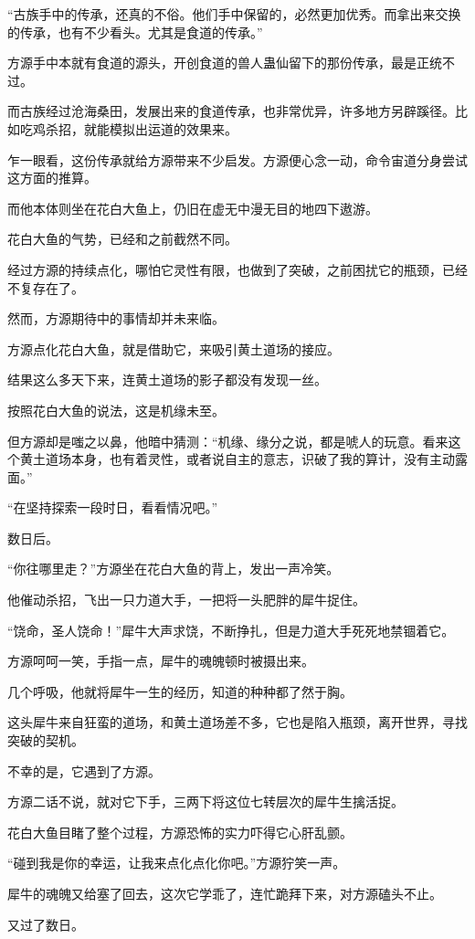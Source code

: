 \begin{this_body}
“古族手中的传承，还真的不俗。他们手中保留的，必然更加优秀。而拿出来交换的传承，也有不少看头。尤其是食道的传承。”

方源手中本就有食道的源头，开创食道的兽人蛊仙留下的那份传承，最是正统不过。

而古族经过沧海桑田，发展出来的食道传承，也非常优异，许多地方另辟蹊径。比如吃鸡杀招，就能模拟出运道的效果来。

乍一眼看，这份传承就给方源带来不少启发。方源便心念一动，命令宙道分身尝试这方面的推算。

而他本体则坐在花白大鱼上，仍旧在虚无中漫无目的地四下遨游。

花白大鱼的气势，已经和之前截然不同。

经过方源的持续点化，哪怕它灵性有限，也做到了突破，之前困扰它的瓶颈，已经不复存在了。

然而，方源期待中的事情却并未来临。

方源点化花白大鱼，就是借助它，来吸引黄土道场的接应。

结果这么多天下来，连黄土道场的影子都没有发现一丝。

按照花白大鱼的说法，这是机缘未至。

但方源却是嗤之以鼻，他暗中猜测：“机缘、缘分之说，都是唬人的玩意。看来这个黄土道场本身，也有着灵性，或者说自主的意志，识破了我的算计，没有主动露面。”

“在坚持探索一段时日，看看情况吧。”

数日后。

“你往哪里走？”方源坐在花白大鱼的背上，发出一声冷笑。

他催动杀招，飞出一只力道大手，一把将一头肥胖的犀牛捉住。

“饶命，圣人饶命！”犀牛大声求饶，不断挣扎，但是力道大手死死地禁锢着它。

方源呵呵一笑，手指一点，犀牛的魂魄顿时被摄出来。

几个呼吸，他就将犀牛一生的经历，知道的种种都了然于胸。

这头犀牛来自狂蛮的道场，和黄土道场差不多，它也是陷入瓶颈，离开世界，寻找突破的契机。

不幸的是，它遇到了方源。

方源二话不说，就对它下手，三两下将这位七转层次的犀牛生擒活捉。

花白大鱼目睹了整个过程，方源恐怖的实力吓得它心肝乱颤。

“碰到我是你的幸运，让我来点化点化你吧。”方源狞笑一声。

犀牛的魂魄又给塞了回去，这次它学乖了，连忙跪拜下来，对方源磕头不止。

又过了数日。


\end{this_body}

